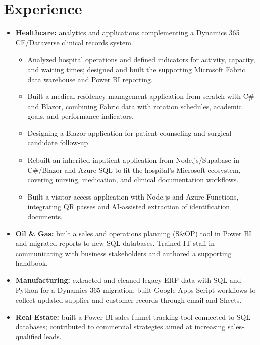 \section{Experience}

\begin{itemize}
  \item \textbf{Healthcare:} analytics and applications complementing a Dynamics 365 CE/Dataverse clinical records system.
    \begin{itemize}
      \item Analyzed hospital operations and defined indicators for activity, capacity,
            and waiting times; designed and built the supporting Microsoft Fabric
            data warehouse and Power BI reporting.
      \item Built a medical residency management application from scratch with
            C\# and Blazor, combining Fabric data with rotation schedules, academic goals,
            and performance indicators.
      \item Designing a Blazor application for patient counseling and surgical candidate follow-up.
      \item Rebuilt an inherited inpatient application from Node.js/Supabase in
            C\#/Blazor and Azure SQL to fit the hospital's Microsoft ecosystem, covering
            nursing, medication, and clinical documentation workflows.
      \item Built a visitor access application with Node.js and Azure Functions,
            integrating QR passes and AI-assisted extraction of identification documents.
    \end{itemize}
  \item \textbf{Oil \& Gas:} built a sales and operations planning (S\&OP) tool in
        Power BI and migrated reports to new SQL databases. Trained IT staff in
        communicating with business stakeholders and authored a supporting handbook.
  \item \textbf{Manufacturing:} extracted and cleaned legacy ERP data with SQL and Python
        for a Dynamics 365 migration; built Google Apps Script workflows to collect
        updated supplier and customer records through email and Sheets.
  \item \textbf{Real Estate:} built a Power BI sales-funnel tracking tool connected
        to SQL databases; contributed to commercial strategies aimed at increasing
        sales-qualified leads.
\end{itemize}
\vspace{4pt}

